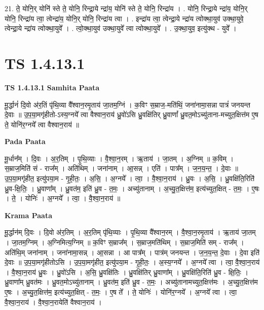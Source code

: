 \documentclass[17pt]{extarticle}
\begin{document}
21. ते॒ योनि॒र् योनि॑ स्ते ते॒ योनि॒ रिन्द्रा॒ये न्द्रा॑य॒ योनि॑ स्ते ते॒ योनि॒ रिन्द्रा॑य । . योनि॒ रिन्द्रा॒ये न्द्रा॑य॒ योनि॒र् योनि॒ रिन्द्रा॑य त्वा॒ त्वेन्द्रा॑य॒ योनि॒र् योनि॒ रिन्द्रा॑य त्वा । . इन्द्रा॑य त्वा॒ त्वेन्द्रा॒ये न्द्रा॑य त्वोक्था॒युव॑ उक्था॒युवे॒ त्वेन्द्रा॒ये न्द्रा॑य त्वोक्था॒युवे᳚ । . त्वो॒क्था॒युव॑ उक्था॒युवे᳚ त्वा त्वोक्था॒युवे᳚ । . उ॒क्था॒युव॒ इत्यु॑क्थ - युवे᳚ । \newline
\pagebreak
{}
\section*{ TS 1.4.13.1 }

\textbf{TS 1.4.13.1 } \newline
\textbf{Samhita Paata} \newline

मू॒र्द्धानं॑ दि॒वो अ॑र॒तिं पृ॑थि॒व्या वै᳚श्वान॒रमृ॒ताय॑ जा॒तम॒ग्निं । क॒विꣳ स॒म्राज॒-मति॑थिं॒ जना॑नामा॒सन्ना पात्रं॑ जनयन्त दे॒वाः ॥ उ॒प॒या॒मगृ॑हीतो-ऽस्य॒ग्नये᳚ त्वा वैश्वान॒राय॑ ध्रु॒वो॑ऽसि ध्रु॒वक्षि॑तिर् ध्रु॒वाणां᳚ ध्रु॒वत॒मोऽच्यु॑ताना-मच्युत॒क्षित्त॑म ए॒ष ते॒ योनि॑र॒ग्नये᳚ त्वा वैश्वान॒राय॑ ॥ \newline

\textbf{Pada Paata} \newline

मू॒र्धान᳚म् । दि॒वः । अ॒र॒तिम् । पृ॒थि॒व्याः । वै॒श्वा॒न॒रम् । ऋ॒ताय॑ । जा॒तम् । अ॒ग्निम् ॥ क॒विम् । स॒म्राज॒मिति॑ सं - राज᳚म् । अति॑थिम् । जना॑नाम् । आ॒सन्न् । एति॑ । पात्र᳚म् । ज॒न॒य॒न्त॒ । दे॒वाः ॥ उ॒प॒या॒मगृ॑हीत॒ इत्यु॑पया॒म - गृ॒ही॒तः॒ । अ॒सि॒ । अ॒ग्नये᳚ । त्वा॒ । वै॒श्वा॒न॒राय॑ । ध्रु॒वः । अ॒सि॒ । ध्रु॒वक्षि॑ति॒रिति॑ ध्रु॒व-क्षि॒तिः॒ । ध्रु॒वाणा᳚म् । ध्रु॒वत॑म॒ इति॑ ध्रु॒व - त॒मः॒ । अच्यु॑तानाम् । अ॒च्यु॒त॒क्षित्त॑म॒ इत्य॑च्युत॒क्षित् - त॒मः॒ । ए॒षः । ते॒ । योनिः॑ । अ॒ग्नये᳚ । त्वा॒ । वै॒श्वा॒न॒राय॑ ॥  \newline


\textbf{Krama Paata} \newline

मू॒र्द्धान॑म् दि॒वः । दि॒वो अ॑र॒तिम् । अ॒र॒तिम् पृ॑थि॒व्याः । पृ॒थि॒व्या वै᳚श्वान॒रम् । वै॒श्वा॒न॒रमृ॒ताय॑ । ऋ॒ताय॑ जा॒तम् । जा॒तम॒ग्निम् । अ॒ग्निमित्य॒ग्निम् ॥ क॒विꣳ स॒म्राज᳚म् । स॒म्राज॒मति॑थिम् । स॒म्राज॒मिति॑ सम् - राज᳚म् । अति॑थि॒म् जना॑नाम् । जना॑नामा॒सन्न् । आ॒सन्ना । आ पात्र᳚म् । पात्र॑म् जनयन्त । ज॒न॒य॒न्त॒ दे॒वाः । दे॒वा इति॑ दे॒वाः ॥ उ॒प॒या॒मगृ॑हीतोऽसि । उ॒प॒या॒मगृ॑हीत॒ इत्यु॑पया॒म - गृ॒ही॒तः॒ । अ॒स्य॒ग्नये᳚ । अ॒ग्नये᳚ त्वा । त्वा॒ वै॒श्वा॒न॒राय॑ । वै॒श्वा॒न॒राय॑ ध्रु॒वः । ध्रु॒वो॑ऽसि । अ॒सि॒ ध्रु॒वक्षि॑तिः । ध्रु॒वक्षि॑तिर् ध्रु॒वाणा᳚म् । ध्रु॒वक्षि॑ति॒रिति॑ ध्रु॒व - क्षि॒तिः॒ । ध्रु॒वाणा᳚म् ध्रु॒वत॑मः । ध्रु॒वत॒मोऽच्यु॑तानाम् । ध्रु॒वत॑म॒ इति॑ ध्रु॒व - त॒मः॒ । अच्यु॑तानामच्युत॒क्षित्त॑मः । अ॒च्यु॒त॒क्षित्त॑म ए॒षः । अ॒च्यु॒त॒क्षित्त॑म॒ इत्य॑च्युत॒क्षित् - त॒मः॒ । ए॒ष ते᳚ । ते॒ योनिः॑ । योनि॑र॒ग्नये᳚ । अ॒ग्नये᳚ त्वा । त्वा॒ वै॒श्वा॒न॒राय॑ । वै॒श्वा॒न॒रायेति॑ वैश्वान॒राय॑ । \newline
\end{document}
